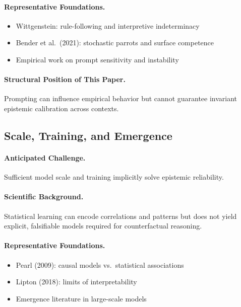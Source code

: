 \paragraph{Representative Foundations.}
\begin{itemize}
    \item Wittgenstein: rule-following and interpretive indeterminacy
    \item Bender et al.\ (2021): stochastic parrots and surface competence
    \item Empirical work on prompt sensitivity and instability
\end{itemize}

\paragraph{Structural Position of This Paper.}
Prompting can influence empirical behavior but cannot guarantee invariant epistemic calibration across contexts.


\subsection{Scale, Training, and Emergence}

\paragraph{Anticipated Challenge.}
Sufficient model scale and training implicitly solve epistemic reliability.

\paragraph{Scientific Background.}
Statistical learning can encode correlations and patterns but does not yield explicit, falsifiable models required for counterfactual reasoning.

\paragraph{Representative Foundations.}
\begin{itemize}
    \item Pearl (2009): causal models vs.\ statistical associations
    \item Lipton (2018): limits of interpretability
    \item Emergence literature in large-scale models
\end{itemize}

